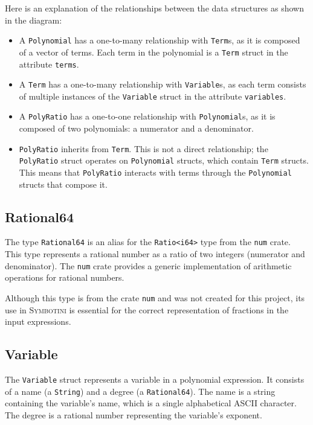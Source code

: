 Here is an explanation of the relationships between the data structures as shown in the diagram:

\begin{itemize}
    \item A \verb|Polynomial| has a one-to-many relationship with \verb|Term|s, as it is composed of a vector of terms. Each term in the polynomial is a \verb|Term| struct in the attribute \verb|terms|.
    \item A \verb|Term| has a one-to-many relationship with \verb|Variable|s, as each term consists of multiple instances of the \verb|Variable| struct in the attribute \verb|variables|.
    \item A \verb|PolyRatio| has a one-to-one relationship with \verb|Polynomial|s, as it is composed of two polynomials: a numerator and a denominator.
    \item \verb|PolyRatio| inherits from \verb|Term|. This is not a direct relationship; the \verb|PolyRatio| struct operates on \verb|Polynomial| structs, which contain \verb|Term| structs. This means that \verb|PolyRatio| interacts with terms through the \verb|Polynomial| structs that compose it.
\end{itemize}

\subsection{Rational64}\label{subsec:ratio64}

The type \verb|Rational64| is an alias for the \verb|Ratio<i64>| type from the \verb|num| crate. This type represents a rational number as a ratio of two integers (numerator and denominator). The \verb|num| crate provides a generic implementation of arithmetic operations for rational numbers.

Although this type is from the crate \verb|num| and was not created for this project, its use in \textsc{Symbotini} is essential for the correct representation of fractions in the input expressions.

\subsection{Variable}\label{subsec:variable}

The \verb|Variable| struct represents a variable in a polynomial expression. It consists of a name (a \verb|String|) and a degree (a \verb|Rational64|). The name is a string containing the variable's name, which is a single alphabetical ASCII character. The degree is a rational number representing the variable's exponent.

